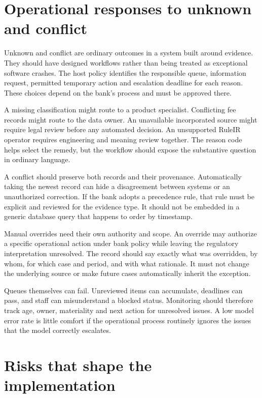 \section{Operational responses to unknown and conflict}
\label{merge:M10:07}


Unknown and conflict are ordinary outcomes in a system built around evidence.
They should have designed workflows rather than being treated as exceptional
software crashes. The host policy identifies the responsible queue, information
request, permitted temporary action and escalation deadline for each reason.
These choices depend on the bank's process and must be approved there.

A missing classification might route to a product specialist. Conflicting fee
records might route to the data owner. An unavailable incorporated source might
require legal review before any automated decision. An unsupported RuleIR operator
requires engineering and meaning review together. The reason code helps select
the remedy, but the workflow should expose the substantive question in ordinary
language.


A conflict should preserve both records and their provenance. Automatically taking
the newest record can hide a disagreement between systems or an unauthorized
correction. If the bank adopts a precedence rule, that rule must be explicit and
reviewed for the evidence type. It should not be embedded in a generic database
query that happens to order by timestamp.

Manual overrides need their own authority and scope. An override may authorize a
specific operational action under bank policy while leaving the regulatory
interpretation unresolved. The record should say exactly what was overridden,
by whom, for which case and period, and with what rationale. It must not change
the underlying source or make future cases automatically inherit the exception.

Queues themselves can fail. Unreviewed items can accumulate, deadlines can pass,
and staff can misunderstand a blocked status. Monitoring should therefore track
age, owner, materiality and next action for unresolved issues. A low model error
rate is little comfort if the operational process routinely ignores the issues
that the model correctly escalates.

\section{Risks that shape the implementation}
\label{merge:P-04-prototype:07}


